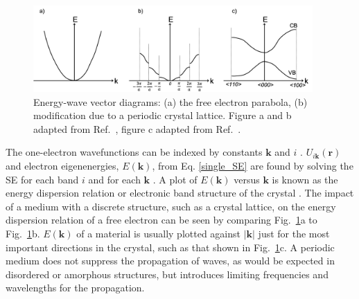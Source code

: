 \documentclass[11pt, twoside]{report}
\begin{document}
\begin{figure}[h!]
  \centering
    \includegraphics[width=0.95\textwidth]{figures/new_bs1_2.png}
    \caption[Energy-wave vector diagrams: (a) the free electron parabola, (b) modification due to a periodic crystal lattice.]{Energy-wave vector diagrams: (a) the free electron parabola, (b) modification due to a periodic crystal lattice. Figure a and b adapted from Ref.~, figure c adapted from Ref.~.}
  \label{bs1}
\end{figure}
The one-electron wavefunctions can be indexed by constants $\boldsymbol{k}$ and $i$ \cite{fund_semi}. 
$U_{i\boldsymbol{k}}(\boldsymbol{r})$ and electron eigenenergies, $E(\boldsymbol{k})$, from Eq. \ref{single_SE} are found by solving the SE for each band $i$ and for each $\boldsymbol{k}$ \cite{Nelson3}.
A plot of $E(\boldsymbol{k})$ versus $\boldsymbol{k}$ is known as the energy dispersion relation or electronic band structure of the crystal \cite{fund_semi}.
The impact of a medium with a discrete structure, such as a crystal lattice, on the energy dispersion relation of a free electron can be seen by comparing Fig.~\ref{bs1}a to Fig.~\ref{bs1}b.
$E(\boldsymbol{k})$ of a material is usually plotted against $|\boldsymbol{k}|$ just for the most important directions in the crystal, such as that shown in Fig.~\ref{bs1}c. A periodic medium does not suppress the propagation of waves, as would be expected in disordered or amorphous structures, but introduces limiting frequencies and wavelengths for the propagation. 
\end{document}
